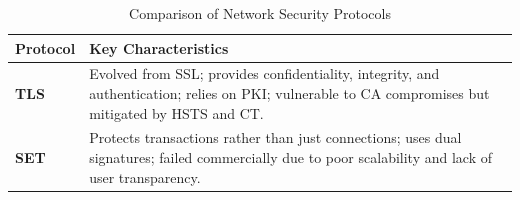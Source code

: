\begin{table}[htpb]
    \centering
    \renewcommand{\arraystretch}{1.3}
    \begin{tabular}{|l|p{10cm}|}
        \hline
        \textbf{Protocol} & \textbf{Key Characteristics} \\ \hline
        \textbf{TLS} & Evolved from SSL; provides confidentiality, integrity, and authentication; relies on PKI; vulnerable to CA compromises but mitigated by HSTS and CT. \\ \hline
        \textbf{SET} & Protects transactions rather than just connections; uses dual signatures; failed commercially due to poor scalability and lack of user transparency. \\ \hline
    \end{tabular}
    \caption{Comparison of Network Security Protocols}
    \label{tab:protocol_summary}
\end{table}
